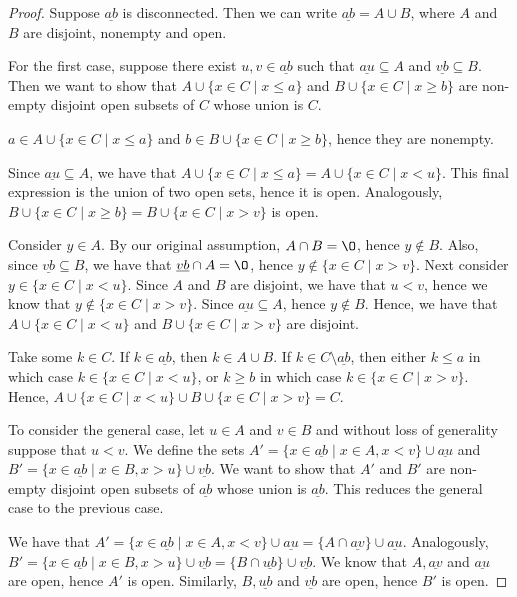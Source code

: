 \documentclass[11pt]{article}
\renewcommand{\emptyset}{\O}
\renewcommand{\_}[1]{\underline{ #1 }}
\theoremstyle{definition}
\numberwithin{equation}{subsection}
\begin{document}
\begin{enumerate}
\begin{proof}
Suppose $\_{ab}$ is disconnected. Then we can write $\_{ab} = A\cup B$, where $A$ and $B$ are disjoint, nonempty and open.

For the first case, suppose there exist $u,v\in\underline{ab}$ such that $\underline{au}\subseteq A$ and $\underline{vb}\subseteq B$. Then we want to show that $A\cup\{x\in C \mid x\leq a\}$ and $B\cup\{x\in C \mid x\geq b\}$ are non-empty disjoint open subsets of $C$ whose union is $C$.

$a \in A\cup\{x\in C \mid x\leq a\}$ and $b \in B\cup\{x\in C \mid x\geq b\}$, hence they are nonempty.

Since $\underline{au} \subseteq A$, we have that $A\cup\{x\in C \mid x\leq a\} = A\cup\{x\in C \mid x<u\}$. This final expression is the union of two open sets, hence it is open. Analogously, $B\cup\{x\in C \mid x\geq b\}=B\cup\{x\in C \mid x>v\}$ is open.

Consider $y \in A$. By our original assumption, $A \cap B = \emptyset$, hence $y \notin B$. Also, since $\underline{vb} \subseteq B$, we have that $\underline{vb} \cap A = \emptyset$, hence $y \notin \{x\in C \mid x>v\}$. Next consider $y \in \{x\in C \mid x<u\}$. Since $A$ and $B$ are disjoint, we have that $u<v$, hence we know that $y \notin \{x\in C \mid x>v\}$. Since $\underline{au} \subseteq A$, hence $y \notin B$. Hence, we have that $A\cup\{x\in C \mid x<u\}$ and $B\cup\{x\in C \mid x>v\}$ are disjoint.

Take some $k \in C$. If $k \in \underline{ab}$, then $k \in A \cup B$. If $k \in C \setminus \underline{ab}$, then either $k \leq a$ in which case $k \in \{x\in C \mid x<u\}$, or $k \geq b$ in which case $k \in \{x\in C \mid x>v\}$. Hence, $A\cup\{x\in C \mid x<u\} \cup B\cup\{x\in C \mid x>v\} = C$. 

To consider the general case, let $u\in A$ and $v\in B$ and without loss of generality suppose that $u < v$. We define the sets $A' = \{x\in\underline{ab} \mid x\in A, x < v\}\cup\underline{au}$ and $B' = \{x\in\underline{ab} \mid x\in B, x > u\}\cup\underline{vb}$. We want to show that $A'$ and $B'$ are non-empty disjoint open subsets of $\underline{ab}$ whose union is $\underline{ab}$. This reduces the general case to the previous case.

We have that $A' = \{x\in\underline{ab} \mid x\in A, x < v\}\cup\underline{au} = \{A \cap \underline{av}\}\cup \underline{au}$. Analogously, $B' = \{x\in\underline{ab} \mid x\in B, x >u\}\cup\underline{vb} = \{B \cap \underline{ub}\}\cup \underline{vb}$. We know that $A, \underline{av}$ and $\underline{au}$ are open, hence $A'$ is open. Similarly, $B, \underline{ub}$ and $\underline{vb}$ are open, hence $B'$ is open.


\end{proof}
\end{enumerate}
\end{document}
